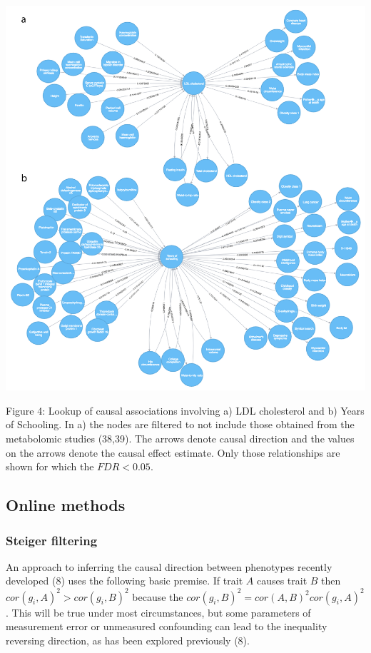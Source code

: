 \documentclass[]{article}
\begin{document}
\includegraphics{images/fig4-01.png}

Figure 4: Lookup of causal associations involving a) LDL cholesterol and
b) Years of Schooling. In a) the nodes are filtered to not include those
obtained from the metabolomic studies (38,39). The arrows denote causal
direction and the values on the arrows denote the causal effect
estimate. Only those relationships are shown for which the
\(FDR < 0.05\).

\newpage

\subsection{Online methods}\label{online-methods}

\subsubsection{Steiger filtering}\label{steiger-filtering-1}

An approach to inferring the causal direction between phenotypes
recently developed (8) uses the following basic premise. If trait \(A\)
causes trait \(B\) then \(cor(g_{i}, A)^2 > cor(g_{i}, B)^2\) because
the \(cor(g_{i}, B)^2 = cor(A, B)^{2} cor(g_{i}, A)^{2}\). This will be
true under most circumstances, but some parameters of measurement error
or unmeasured confounding can lead to the inequality reversing
direction, as has been explored previously (8).
\end{document}
